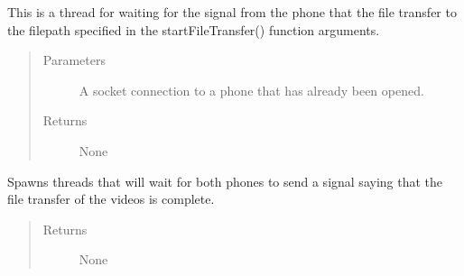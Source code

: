 \documentclass[letterpaper,10pt,english]{sphinxmanual}
\begin{document}
\begin{fulllineitems}

\begin{fulllineitems}
\label{\detokenize{index:src.Controllers.PhoneController.PhoneControl.threadWaitForFileTransfer}}
This is a thread for waiting for the signal from the phone that the file transfer to the filepath specified
in the startFileTransfer() function arguments.
\begin{quote}\begin{description}
\item[{Parameters}] \leavevmode
{} \textendash{} A socket connection to a phone that has already been opened.

\item[{Returns}] \leavevmode
None

\end{description}\end{quote}

\end{fulllineitems}


\begin{fulllineitems}
\label{\detokenize{index:src.Controllers.PhoneController.PhoneControl.waitForFileTransfer}}
Spawns threads that will wait for both phones to send a signal saying that the file transfer
of the videos is complete.
\begin{quote}\begin{description}
\item[{Returns}] \leavevmode
None

\end{description}\end{quote}

\end{fulllineitems}


\end{fulllineitems}
\end{document}
